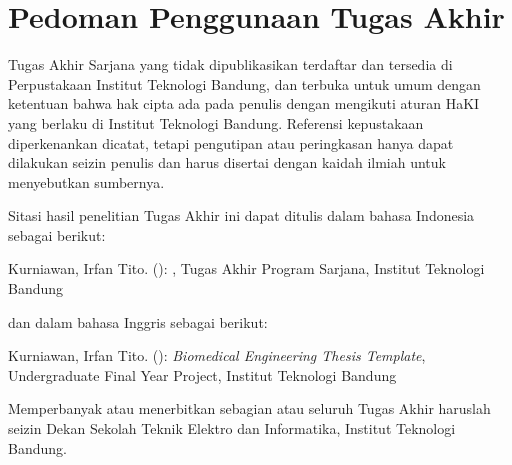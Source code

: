 \clearpage
\chapter*{Pedoman Penggunaan Tugas Akhir}

Tugas Akhir Sarjana yang tidak dipublikasikan terdaftar dan tersedia di Perpustakaan Institut Teknologi Bandung, dan terbuka untuk umum dengan ketentuan bahwa hak cipta ada pada penulis dengan mengikuti aturan HaKI yang berlaku di Institut Teknologi Bandung. Referensi kepustakaan diperkenankan dicatat, tetapi pengutipan atau peringkasan hanya dapat dilakukan seizin penulis dan harus disertai dengan kaidah ilmiah untuk menyebutkan sumbernya.

Sitasi hasil penelitian Tugas Akhir ini dapat ditulis dalam bahasa Indonesia sebagai berikut:

\hangindent=1.27cm Kurniawan, Irfan Tito. (\the\year): \textit{\thetitle}, Tugas Akhir Program Sarjana, Institut Teknologi Bandung

dan dalam bahasa Inggris sebagai berikut:

\hangindent=1.27cm Kurniawan, Irfan Tito. (\the\year): \textit{Biomedical Engineering Thesis Template}, Undergraduate Final Year Project, Institut Teknologi Bandung

Memperbanyak atau menerbitkan sebagian atau seluruh Tugas Akhir haruslah seizin Dekan Sekolah Teknik Elektro dan Informatika, Institut Teknologi Bandung.

\clearpage